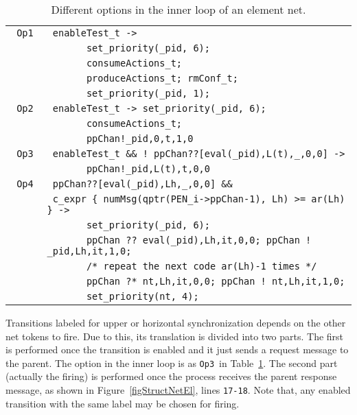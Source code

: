 \documentclass{llncs}
\begin{document}
\small
\begin{table}[t!]
\begin{center}\begin{tabular}{|l|l|}
      \hline
      \verb" Op1 "  & \verb" enableTest_t ->  "  \\
                    & \verb"       set_priority(_pid, 6);"  \\
                    & \verb"       consumeActions_t;"  \\
                    & \verb"       produceActions_t; rmConf_t;"  \\
                    & \verb"       set_priority(_pid, 1);"  \\
      \hline
      \verb" Op2 "  & \verb" enableTest_t -> set_priority(_pid, 6); "  \\
                    & \verb"       consumeActions_t;" \\
                    & \verb"       ppChan!_pid,0,t,1,0"  \\
      \hline
      \verb" Op3 "  & \verb" enableTest_t && ! ppChan??[eval(_pid),L(t),_,0,0] ->  "\\
                    & \verb"       ppChan!_pid,L(t),t,0,0" \\
      \hline
      \verb" Op4 "  & \verb" ppChan??[eval(_pid),Lh,_,0,0] && "  \\
                    & \verb" c_expr { numMsg(qptr(PEN_i->ppChan-1), Lh) >= ar(Lh) } ->  "  \\
                    & \verb"       set_priority(_pid, 6); "  \\
                    & \verb"       ppChan ?? eval(_pid),Lh,it,0,0; ppChan ! _pid,Lh,it,1,0; "  \\
                    & \verb"       /* repeat the next code ar(Lh)-1 times */ "  \\
                    & \verb"       ppChan ?* nt,Lh,it,0,0; ppChan ! nt,Lh,it,1,0; "  \\
                    & \verb"       set_priority(nt, 4); "  \\
      \hline
\end{tabular}\end{center}
\caption{Different options in the inner loop of an element net.}
\label{tab.opt.el.net}
\end{table}
\normalsize




Transitions labeled for upper or horizontal synchronization depends on the other net tokens to fire. Due to this, its translation is divided into two parts. The first is performed once the transition is enabled and it just sends a request message to the parent. The option in the inner loop is as \small\verb"Op3"\nfont\  in Table~\ref{tab.opt.el.net}. The second part (actually the firing) is performed once the process receives the parent response message, as shown in Figure~\ref{figStructNetEl}, lines \small\verb"17-18"\nfont. Note that, any enabled transition with the same label may be chosen for firing.
\end{document}
